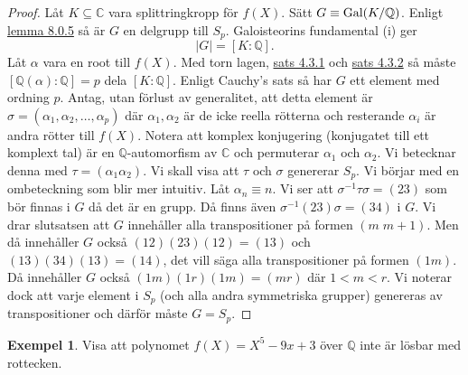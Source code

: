 \documentclass{article}
\newcommand{\gal}[0]{\textnormal{Gal}}
\theoremstyle{definition}
\newtheorem{exmp}[thm]{Exempel}
\begin{document}
\begin{proof}
  Låt $K \subseteq \mathbb{C}$ vara splittringkropp för $f(X)$. Sätt $G \equiv \gal(K/\mathbb{Q})$. Enligt 
  \hyperlink{lemma9.0.5}{lemma 8.0.5} så är $G$ en delgrupp till $S_p$. Galoisteorins fundamental (i) ger 
  \[|G| = [K:\mathbb{Q}].\]
  Låt $\alpha$ vara en root till $f(X)$. 
  Med torn lagen, \hyperlink{minpol}{sats 4.3.1} och \hyperlink{5.3.2}{sats 4.3.2} så 
  måste $[\mathbb{Q}(\alpha): \mathbb{Q}] = p$ dela $[K:\mathbb{Q}]$. Enligt Cauchy's sats så har $G$ ett element med ordning $p$. 
  Antag, utan förlust av generalitet, att detta element är $\sigma = (\alpha_1, \alpha_2, \ldots, \alpha_p)$ där $\alpha_1, \alpha_2$ är 
  de icke reella rötterna och resterande $\alpha_i$ är andra rötter till $f(X)$. Notera att komplex konjugering (konjugatet till ett komplext tal)
  är en $\mathbb{Q}$-automorfism av $\mathbb{C}$ och permuterar $\alpha_1$ och $\alpha_2$. Vi betecknar denna med $\tau = (\alpha_1 \alpha_2)$. 
  Vi skall visa att $\tau$ och $\sigma$ genererar $S_p$. Vi börjar med en ombeteckning som blir mer intuitiv. Låt $\alpha_n \equiv n$. 
  Vi ser att $\sigma^{-1}\tau \sigma = (23)$ som bör finnas i $G$ då det är en grupp. Då finns även $\sigma^{-1}(23)\sigma = (34)$ i $G$. 
  Vi drar slutsatsen att $G$ innehåller alla transpositioner på formen $(m \; m+1)$. Men då innehåller $G$ också 
  $(12)(23)(12) = (13)$ och $(13)(34)(13) = (14)$, det vill säga alla transpositioner på formen $(1m)$. Då innehåller 
  $G$ också $(1m)(1r)(1m) = (mr)$ där $1 < m < r$. Vi noterar dock att varje element i $S_p$ (och alla andra symmetriska grupper) genereras 
  av transpositioner och därför måste $G = S_p$.
\end{proof}

\begin{exmp}
  Visa att polynomet $f(X) = X^5 - 9x + 3$ över $\mathbb{Q}$ inte är lösbar med rottecken. 
\end{exmp}
\end{document}
